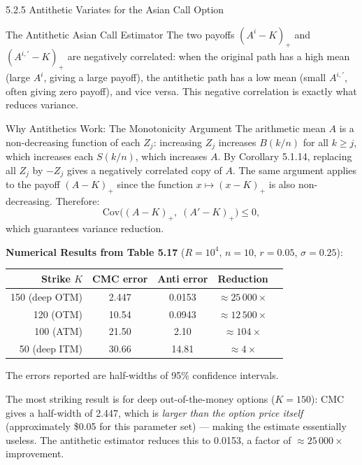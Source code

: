 \documentclass[aspectratio=169,10pt]{beamer}
\begin{document}
\begin{frame}[allowframebreaks]{5.2.5 Antithetic Variates for the Asian Call Option}
\begin{block}{The Antithetic Asian Call Estimator}
  The two payoffs $(A^i - K)_+$ and $(A^{i,\prime} - K)_+$ are negatively
  correlated: when the original path has a high mean (large $A^i$, giving a
  large payoff), the antithetic path has a low mean (small $A^{i,\prime}$,
  often giving zero payoff), and vice versa.  This negative correlation is
  exactly what reduces variance.
\end{block}

\begin{block}{Why Antithetics Work: The Monotonicity Argument}
  The arithmetic mean $A$ is a non-decreasing function of each $Z_j$:
  increasing $Z_j$ increases $B(k/n)$ for all $k \ge j$, which increases
  each $S(k/n)$, which increases $A$.  By Corollary 5.1.14, replacing all
  $Z_j$ by $-Z_j$ gives a negatively correlated copy of $A$.  The same
  argument applies to the payoff $(A - K)_+$ since the function $x \mapsto
  (x - K)_+$ is also non-decreasing.  Therefore:
  \[
    \mathrm{Cov}\bigl((A - K)_+,\; (A' - K)_+\bigr) \le 0,
  \]
  which guarantees variance reduction.
\end{block}

\framebreak

\textbf{Numerical Results from Table 5.17}
($R = 10^4$, $n = 10$, $r = 0.05$, $\sigma = 0.25$):

\begin{center}\small
  \begin{tabular}{rcccc}
    \toprule
    Strike $K$ &
    CMC error &
    Anti error &
    Reduction \\
    \midrule
    150 (deep OTM) & 2.447 & 0.0153 & $\approx 25\,000\times$ \\
    120 (OTM)      & 10.54 & 0.0943 & $\approx 12\,500\times$ \\
    100 (ATM)      & 21.50 & 2.10   & $\approx 104\times$ \\
     50 (deep ITM) & 30.66 & 14.81  & $\approx 4\times$ \\
    \bottomrule
  \end{tabular}
\end{center}

\small
The errors reported are half-widths of 95\% confidence intervals.

The most striking result is for deep out-of-the-money options ($K = 150$):
CMC gives a half-width of 2.447, which is \emph{larger than the option price
itself} (approximately \$0.05 for this parameter set) --- making the estimate
essentially useless.  The antithetic estimator reduces this to 0.0153, a
factor of $\approx 25\,000\times$ improvement.


\end{frame}
\end{document}

